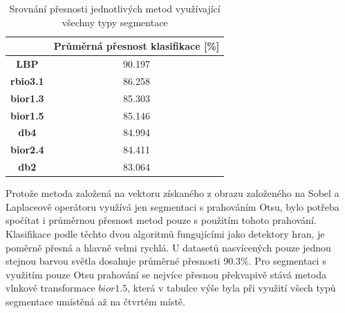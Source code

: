 \capstartfalse
\begin{table}[!htbp]
\centering
\begin{tabular}{|c|c|}
\hline
                 & \textbf{Průměrná přesnost klasifikace {[}\%{]}} \\ \hline
\textbf{LBP}     & 90.197                                         \\ \hline
\textbf{rbio3.1} & 86.258                                         \\ \hline
\textbf{bior1.3} & 85.303                                         \\ \hline
\textbf{bior1.5} & 85.146                                         \\ \hline
\textbf{db4}     & 84.994                                         \\ \hline
\textbf{bior2.4} & 84.411                                         \\ \hline
\textbf{db2}     & 83.064                                         \\ \hline
\end{tabular}
\caption{Srovnání přesnosti jednotlivých metod využívající všechny typy segmentace}
\end{table}
\capstarttrue

Protože metoda založená na vektoru získaného z obrazu založeného na Sobel a Laplaceově operátoru využívá jen segmentaci s prahováním Otsu, bylo potřeba spočítat i průměrnou přesnost metod pouze s použitím tohoto prahování. Klasifikace podle těchto dvou algoritmů fungujícími jako detektory hran, je poměrně přesná a hlavně velmi rychlá. U datasetů nasvícených pouze jednou stejnou barvou světla dosahuje průměrné přesnosti 90.3\%. Pro segmentaci s využitím pouze Otsu prahování se nejvíce přesnou překvapivě stává metoda vlnkové transformace $bior1.5$, která v tabulce výše byla při využití všech typů segmentace umístěná až na čtvrtém místě.

